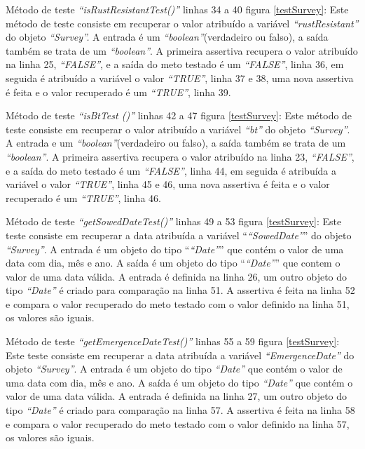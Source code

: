 Método de teste\textit{ “isRustResistantTest()”} linhas 34 a 40 figura \ref{testSurvey}:  Este método de teste consiste em recuperar o valor atribuído a variável\textit{ “rustResistant”} do objeto \textit{“Survey”.} A entrada é um \textit{“boolean”}(verdadeiro ou falso), a saída também se trata de um \textit{“boolean”}. A primeira assertiva recupera o valor atribuído na linha 25, \textit{“FALSE”}, e a saída do meto testado é um\textit{ “FALSE”}, linha 36, em seguida é atribuído a variável o valor \textit{“TRUE”}, linha 37 e 38, uma nova assertiva é feita e o valor recuperado é um \textit{“TRUE”}, linha 39.

Método de teste \textit{“isBtTest ()”} linhas 42 a 47 figura \ref{testSurvey}: Este método de teste consiste em recuperar o valor atribuído a variável\textit{ “bt”} do objeto \textit{“Survey”}. A entrada e um \textit{“boolean”}(verdadeiro ou falso), a saída também se trata de um \textit{“boolean”}. A primeira assertiva recupera o valor atribuído na linha 23, \textit{“FALSE”}, e a saída do meto testado é um \textit{“FALSE”}, linha 44, em seguida é atribuída a variável o valor \textit{“TRUE”}, linha 45 e 46, uma nova assertiva é feita e o valor recuperado é um \textit{“TRUE”}, linha 46.

Método de teste \textit{“getSowedDateTest()”} linhas 49 a 53 figura \ref{testSurvey}: Este teste consiste em recuperar a data atribuída a variável “\textit{“SowedDate”}” do objeto \textit{“Survey”}. A entrada é um objeto do tipo “\textit{“Date”}” que contém o valor de uma data com dia, mês e ano. A saída é um objeto do tipo “\textit{“Date”}” que contem o valor de uma data válida. A entrada é definida na linha 26, um outro objeto do tipo \textit{“Date”} é criado para comparação na linha 51. A assertiva é feita na linha 52 e compara o valor recuperado do meto testado com o valor definido na linha 51, os valores são iguais.  

Método de teste \textit{“getEmergenceDateTest()”} linhas 55 a 59 figura \ref{testSurvey}: Este teste consiste em recuperar a data atribuída a variável \textit{“EmergenceDate”} do objeto \textit{“Survey”}. A entrada é um objeto do tipo \textit{“Date”} que contém o valor de uma data com dia, mês e ano. A saída é um objeto do tipo \textit{“Date”} que contém o valor de uma data válida. A entrada é definida na linha 27, um outro objeto do tipo \textit{“Date”} é criado para comparação na linha 57. A assertiva é feita na linha 58 e compara o valor recuperado do meto testado com o valor definido na linha 57, os valores são iguais.  

